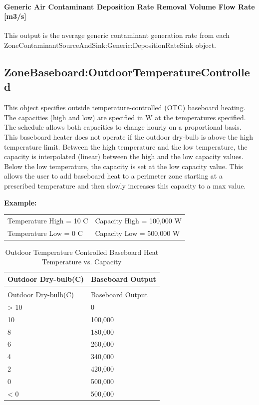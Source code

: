 \paragraph{Generic Air Contaminant Deposition Rate Removal Volume Flow Rate {[}m3/s{]}}\label{generic-air-contaminant-deposition-rate-removal-volume-flow-rate-m3s}

This output is the average generic contaminant generation rate from each Zone\-Contaminant\-Source\-And\-Sink:\-Generic:\-Deposition\-Rate\-Sink object.

\subsection{ZoneBaseboard:OutdoorTemperatureControlled}\label{zonebaseboardoutdoortemperaturecontrolled}

This object specifies outside temperature-controlled (OTC) baseboard heating. The capacities (high and low) are specified in W at the temperatures specified. The schedule allows both capacities to change hourly on a proportional basis. This baseboard heater does not operate if the outdoor dry-bulb is above the high temperature limit. Between the high temperature and the low temperature, the capacity is interpolated (linear) between the high and the low capacity values. Below the low temperature, the capacity is set at the low capacity value. This allows the user to add baseboard heat to a perimeter zone starting at a prescribed temperature and then slowly increases this capacity to a max value.

\textbf{Example:}

\begin{center}
  \begin{tabular}{@{}ll@{}}
    Temperature High = 10 C & Capacity High = 100,000 W \\
    Temperature Low = 0 C & Capacity Low = 500,000 W
  \end{tabular}
\end{center}

\begin{longtable}[c]{@{}ll@{}}
\caption{Outdoor Temperature Controlled Baseboard Heat Temperature vs. Capacity \label{table:outdoor-temperature-controlled-baseboard-heat}} \tabularnewline
\toprule 
Outdoor Dry-bulb(C) & Baseboard Output \tabularnewline
\midrule
\endfirsthead

\caption[]{Outdoor Temperature Controlled Baseboard Heat Temperature vs. Capacity} \tabularnewline
\toprule 
Outdoor Dry-bulb(C) & Baseboard Output \tabularnewline
\midrule
\endhead

> 10 & 0 \tabularnewline
10 & 100,000 \tabularnewline
8 & 180,000 \tabularnewline
6 & 260,000 \tabularnewline
4 & 340,000 \tabularnewline
2 & 420,000 \tabularnewline
0 & 500,000 \tabularnewline
< 0 & 500,000 \tabularnewline
\bottomrule
\end{longtable}

